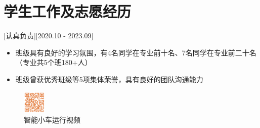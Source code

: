 \documentclass{resume}
\begin{document}
\section{学生工作及志愿经历}
[认真负责][2020.10 - 2023.09] 
\begin{itemize}
  \item 班级具有良好的学习氛围，有4名同学在专业前十名、7名同学在专业前二十名（专业共5个班180+人）
  \item 班级曾获优秀班级等5项集体荣誉，具有良好的团队沟通能力
\end{itemize}

\begin{figure}[h]
  \centering
  \includegraphics[width=0.1\textwidth]{aicar.png}
  \caption{智能小车运行视频}
  \label{fig:example}
\end{figure}
\end{document}
